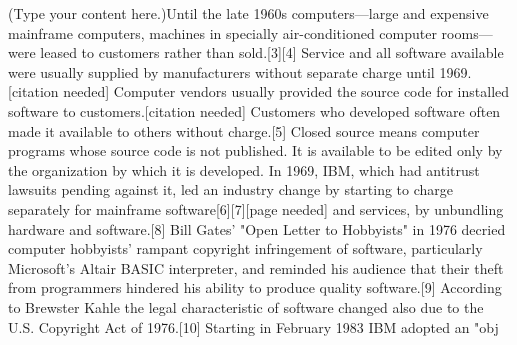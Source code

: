 \documentclass[a4paper]{article}
\begin{document}


(Type your content here.)Until the late 1960s computers—large and expensive mainframe computers, machines in specially air-conditioned computer rooms—were leased to customers rather than sold.[3][4] Service and all software available were usually supplied by manufacturers without separate charge until 1969.[citation needed] Computer vendors usually provided the source code for installed software to customers.[citation needed] Customers who developed software often made it available to others without charge.[5] Closed source means computer programs whose source code is not published. It is available to be edited only by the organization by which it is developed.
In 1969, IBM, which had antitrust lawsuits pending against it, led an industry change by starting to charge separately for mainframe software[6][7][page needed] and services, by unbundling hardware and software.[8]
Bill Gates' "Open Letter to Hobbyists" in 1976 decried computer hobbyists' rampant copyright infringement of software, particularly Microsoft's Altair BASIC interpreter, and reminded his audience that their theft from programmers hindered his ability to produce quality software.[9]
According to Brewster Kahle the legal characteristic of software changed also due to the U.S. Copyright Act of 1976.[10]
Starting in February 1983 IBM adopted an "obj
\end{document}
